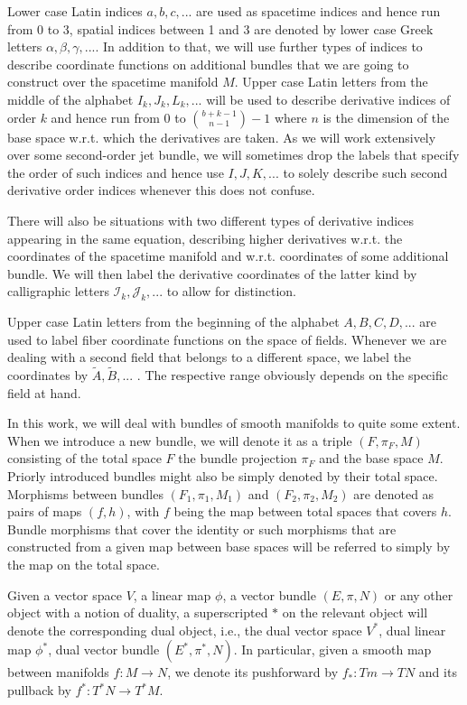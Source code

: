 \documentclass[a4paper,12pt, DIV=14, BCOR=5mm, twoside, headsepline, numbers=noenddot]{scrbook}
\begin{document}
Lower case Latin indices $a,b,c,...$ are used as spacetime indices and hence run from 0 to 3, spatial indices between 1 and 3 are denoted by lower case Greek letters $\alpha,\beta,\gamma,...$. In addition to that, we will use further types of indices to describe coordinate functions on additional bundles that we are going to construct over the spacetime manifold $M$. Upper case Latin letters from the middle of the alphabet $I_k,J_k,L_k,...$ will be used to describe derivative indices of order $k$ and hence run from $0$ to $\binom{b+k-1}{n-1}-1$ where $n$ is the dimension of the base space w.r.t. which the derivatives are taken. As we will work extensively over some second-order jet bundle, we will sometimes drop the labels that specify the order of such indices and hence use $I,J,K,...$ to solely describe such second derivative order indices whenever this does not confuse.

There will also be situations with two different types of derivative indices appearing in the same equation, describing higher derivatives w.r.t. the coordinates of the spacetime manifold and w.r.t. coordinates of some additional bundle. We will then label the derivative coordinates of the latter kind by calligraphic letters $\mathcal{I}_k, \mathcal{J}_k,...$ to allow for distinction.

Upper case Latin letters from the beginning of the alphabet $A,B,C,D,...$ are used to label fiber coordinate functions on the space of fields. Whenever we are dealing with a second field that belongs to a different space, we label the coordinates by $\tilde{A}, \tilde{B},...$ . The respective range obviously depends on the specific field at hand.

In this work, we will deal with bundles of smooth manifolds to quite some extent. When we introduce a new bundle, we will denote it as a triple $(F,\pi_F,M)$ consisting of the total space $F$ the bundle projection $\pi_F$ and the base space $M$. Priorly introduced bundles might also be simply denoted by their total space. Morphisms between bundles $(F_1,\pi_1,M_1)$ and $(F_2,\pi_2,M_2)$ are denoted as pairs of maps $(f,h)$, with $f$ being the map between total spaces that covers $h$. Bundle morphisms that cover the identity or such morphisms that are constructed from a given map between base spaces will be referred to simply by the map on the total space.

Given a vector space $V$, a linear map $\phi$, a vector bundle $(E,\pi,N)$ or any other object with a notion of duality, a superscripted $\ast$ on the relevant object will denote the corresponding dual object, i.e., the dual vector space $V^{\ast}$, dual linear map $\phi^{\ast}$, dual vector bundle $(E^{\ast}, \pi^{\ast},N)$. In particular, given a smooth map between manifolds $f : M \rightarrow N$, we denote its pushforward by $f_{\ast} : Tm \rightarrow TN$ and its pullback by $f^{\ast} : T^{\ast}N \rightarrow T^{\ast}M$.
\end{document}
